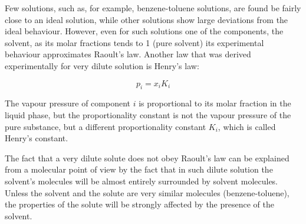 \documentclass[12pt,a4paper]{report}
\newif\ifstudents
\begin{document}
   Few solutions, such as, for example, benzene-toluene solutions, are found be fairly close to an ideal solution, while other solutions show large deviations from the ideal behaviour. However, even for such solutions one of the components, the solvent, as its molar fractions tends to 1 (pure solvent) its experimental behaviour approximates Raoult's law.
   Another law that was derived experimentally for very dilute solution is Henry's law:
      \ifstudents \hideit[2]{ \fi
   \begin{equation*}
   p_{i}=x_{i}K_{i}
   \end{equation*}
   \ifstudents } \fi
   The vapour pressure of component $i$ is proportional to its molar fraction in the liquid phase, but the proportionality constant is not the vapour pressure of the pure substance, but a different proportionality constant $K_{i}$, which is called Henry's constant. 
   \begin{center}
   \end{center}
   
   The fact that a very dilute solute does not obey Raoult's law can be explained from a molecular point of view by the fact that in such dilute solution the solvent's molecules will be almost entirely surrounded by solvent molecules. Unless the solvent and the solute are very similar molecules (benzene-toluene), the properties of the solute will be strongly affected by the presence of the solvent.
\end{document}
